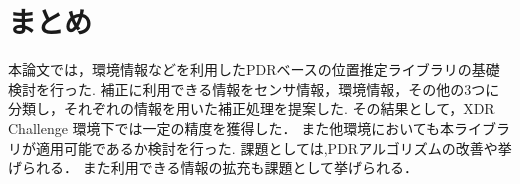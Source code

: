 

\section{まとめ}
本論文では，環境情報などを利用したPDRベースの位置推定ライブラリの基礎検討を行った.
補正に利用できる情報をセンサ情報，環境情報，その他の3つに分類し，それぞれの情報を用いた補正処理を提案した.
その結果として，XDR Challenge 環境下では一定の精度を獲得した．
また他環境においても本ライブラリが適用可能であるか検討を行った.
課題としては,PDRアルゴリズムの改善や挙げられる．
また利用できる情報の拡充も課題として挙げられる．
